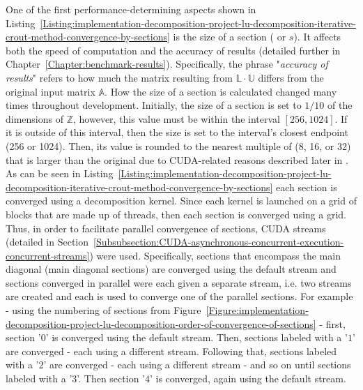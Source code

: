 One of the first performance-determining aspects shown in Listing~\ref{Listing:implementation-decomposition-project-lu-decomposition-iterative-crout-method-convergence-by-sections} is the size of a section ( or $ s $). It affects both the speed of computation and the accuracy of results (detailed further in Chapter~\ref{Chapter:benchmark-results}). Specifically, the phrase "\textit{accuracy of results}" refers to how much the matrix resulting from $ \mathbb{L}\cdot\mathbb{U} $ differs from the original input matrix $ \mathbb{A} $. How the size of a section is calculated changed many times throughout development. Initially, the size of a section is set to $ 1/10 $ of the dimensions of $ \mathbb{Z} $, however, this value must be within the interval $ \left[256, 1024\right] $. If it is outside of this interval, then the size is set to the interval's closest endpoint (256 or 1024). Then, its value is rounded to the nearest multiple of  (8, 16, or 32) that is larger than the original  due to CUDA-related reasons described later in \textit{}. \\
As can be seen in Listing~\ref{Listing:implementation-decomposition-project-lu-decomposition-iterative-crout-method-convergence-by-sections} each section is converged using a decomposition kernel. Since each kernel is launched on a grid of blocks that are made up of threads, then each section is converged using a grid. Thus, in order to facilitate parallel convergence of sections, CUDA streams (detailed in Section~\ref{Subsubsection:CUDA-asynchronous-concurrent-execution-concurrent-streams}) were used. Specifically, sections that encompass the main diagonal (main diagonal sections) are converged using the default stream and sections converged in parallel were each given a separate stream, i.e. two streams are created and each is used to converge one of the parallel sections. For example - using the numbering of sections from Figure~\ref{Figure:implementation-decomposition-project-lu-decomposition-order-of-convergence-of-sections} - first, section '$ 0 $' is converged using the default stream. Then, sections labeled with a '$ 1 $' are converged - each using a different stream. Following that, sections labeled with a '$ 2 $' are converged - each using a different stream - and so on until sections labeled with a '$ 3 $'. Then section '$ 4 $' is converged, again using the default stream. \\
